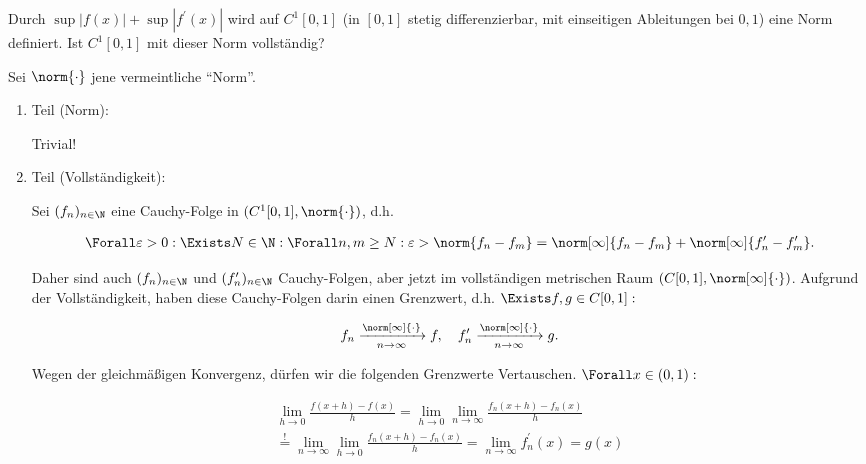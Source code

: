 
\begin{exercise}

Durch $\sup |f(x)| + \sup |f^\prime(x)|$ wird auf $C^1[0, 1]$ (in $[0, 1]$ stetig differenzierbar, mit einseitigen Ableitungen bei $0, 1$) eine Norm definiert.
Ist $C^1[0, 1]$ mit dieser Norm vollständig?

\end{exercise}


\begin{solution}

Sei $\norm{\cdot}$ jene vermeintliche \enquote{Norm}.

\begin{enumerate}[label = \arabic*.]

    \item Teil (Norm):

    Trivial!

    \item Teil (Vollständigkeit):
    
    Sei $(f_n)_{n \in \N}$ eine Cauchy-Folge in $(C^1[0, 1], \norm{\cdot})$, d.h.

    \begin{align*}
        \Forall \varepsilon > 0:
        \Exists N \in \N:
        \Forall n, m \geq N:
        \varepsilon > \norm{f_n - f_m} = \norm[\infty]{f_n - f_m} + \norm[\infty]{f_n^\prime - f_m^\prime}.
    \end{align*}

    Daher sind auch $(f_n)_{n \in \N}$ und $(f_n^\prime)_{n \in \N}$ Cauchy-Folgen, aber jetzt im vollständigen metrischen Raum $(C[0, 1], \norm[\infty]{\cdot})$.
    Aufgrund der Vollständigkeit, haben diese Cauchy-Folgen darin einen Grenzwert, d.h. $\Exists f, g \in C[0, 1]:$

    \begin{align*}
        f_n \xrightarrow[n \to \infty]{\norm[\infty]{\cdot}} f,
        \quad
        f_n^\prime \xrightarrow[n \to \infty]{\norm[\infty]{\cdot}} g.
    \end{align*}

    Wegen der gleichmäßigen Konvergenz, dürfen wir die folgenden Grenzwerte Vertauschen.
    $\Forall x \in (0, 1):$

    \begin{multline*}
        \lim_{h \to 0}
        \frac{f(x + h) - f(x)}{h}
        =
        \lim_{h \to 0}
        \lim_{n \to \infty}
        \frac{f_n(x + h) - f_n(x)}{h} \\
        \stackrel{!}{=}
        \lim_{n \to \infty}
        \lim_{h \to 0}
        \frac{f_n(x + h) - f_n(x)}{h}
        =
        \lim_{n \to \infty}
        f_n^\prime(x)
        =
        g(x)
    \end{multline*}


\end{enumerate}
\end{solution}
